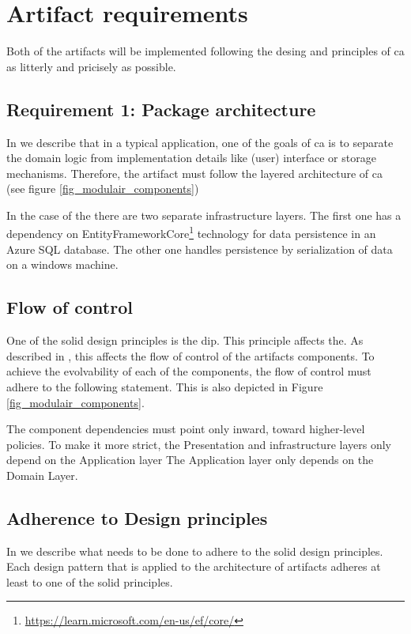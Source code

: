 \section{Artifact requirements} \label{sec_artifact_requirements}

Both of the artifacts will be implemented following the desing and principles of \gls{ca}
as litterly and pricisely as possible.

\subsection*{Requirement 1: Package architecture}
In  we describe that in a typical application, one of the goals of
\gls{ca} is to separate the domain logic from implementation details like (user) interface
or storage mechanisms. Therefore, the artifact must follow the layered architecture of
\gls{ca} (see figure \ref{fig_modulair_components})

In the case of the  there are two separate infrastructure
layers. The first one has a dependency on
EntityFrameworkCore\footnote{\url{https://learn.microsoft.com/en-us/ef/core/}} technology
for data persistence in an Azure SQL database. The other one handles persistence by
serialization of data on a windows machine.

\subsection{Flow of control}
One of the \gls{solid} design principles is the \acrfull{dip}. This principle affects the.
As described in , this affects the flow of control of the
artifacts components. To achieve the evolvability of each of the components, the flow of
control must adhere to the following statement. This is also depicted in Figure
\ref{fig_modulair_components}.

The component dependencies must point only inward, toward higher-level policies. To make
it more strict, the Presentation and infrastructure layers only depend on the Application
layer The Application layer only depends on the  Domain Layer.

\subsection{Adherence to Design principles}
In  we describe what needs to be done to adhere to the
\gls{solid} design principles. Each design pattern that is applied to the architecture of
artifacts adheres at least to one of the \gls{solid} principles.

